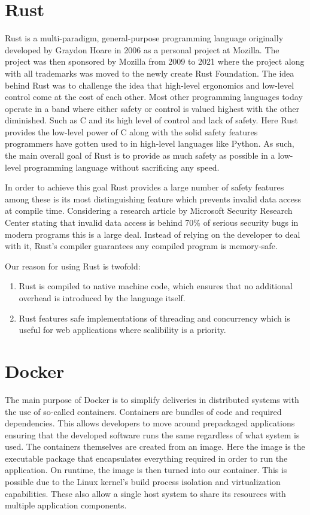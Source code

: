 \section*{Rust}
Rust is a multi-paradigm, general-purpose programming language originally developed by Graydon Hoare in 2006 as a personal project at Mozilla. 
The project was then sponsored by Mozilla from 2009 to 2021 where the project along with all trademarks was moved to the newly create Rust Foundation. 
The idea behind Rust was to challenge the idea that high-level ergonomics and low-level control come at the cost of each other\cite{Rust_Book}.
Most other programming languages today operate in a band where either safety or control is valued highest with the other diminished. Such as C and its high level of control and lack of safety. 
Here Rust provides the low-level power of C along with the solid safety features programmers have gotten used to in high-level languages like Python. 
As such, the main overall goal of Rust is to provide as much safety as possible in a low-level programming language without sacrificing any speed\cite{Rust_in_Action}.

In order to achieve this goal Rust provides a large number of safety features among these is its most distinguishing feature which prevents invalid data access at compile time. 
Considering a research article by Microsoft Security Research Center stating that invalid data access is behind 70\% of serious security bugs in modern programs this is a large deal\cite{Safe_Systems_Languages}. 
Instead of relying on the developer to deal with it, Rust's compiler guarantees any compiled program is memory-safe.

Our reason for using Rust is twofold: 
\begin{enumerate}
    \item Rust is compiled to native machine code, which ensures that no additional overhead is introduced by the language itself.
    \item Rust features safe implementations of threading and concurrency which is useful for web applications where scalibility is a priority.
\end{enumerate}

\section*{Docker}
The main purpose of Docker is to simplify deliveries in distributed systems with the use of so-called containers\cite{Docker_Container}.
Containers are bundles of code and required dependencies. This allows developers to move around prepackaged applications ensuring that the developed software runs the same regardless of what system is used\cite{Docker_Container}.
The containers themselves are created from an image. Here the image is the executable package that encapsulates everything required in order to run the application. On runtime, the image is then turned into our container. 
This is possible due to the Linux kernel's build process isolation and virtualization capabilities. These also allow a single host system to share its resources with multiple application components\cite{Docker_Container}.

